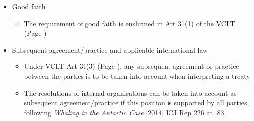 \begin{itemize}
    \item Good faith
    \begin{itemize}
        \item The requirement of good faith is enshrined in Art 31(1) of the VCLT (Page \pageref{VCLT Art 31})
    \end{itemize}
    \item Subsequent agreement/practice and applicable international law
    \begin{itemize}
        \item Under VCLT Art 31(3) (Page \pageref{VCLT Art 31}), any subsequent agreement or practice between the parties is to be taken into account when interpreting a treaty
        \item The resolutions of internal organisations can be taken into account as subsequent agreement/practice if this position is supported by all parties, following \textit{Whaling in the Antartic Case} [2014] ICJ Rep 226 at [83]
    \end{itemize}
\end{itemize}

